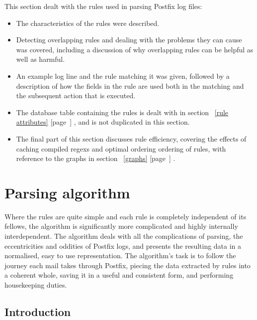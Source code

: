 \documentclass[a4paper,12pt,draft]{article}
\newcommand{\refwithpage}[1]{%
    \empty{}\ref{#1} [page~\pageref{#1}]%
}
\begin{document}
This section dealt with the rules used in parsing Postfix log files:

\begin{itemize}

    \item The characteristics of the rules were described.

    \item Detecting overlapping rules and dealing with the problems they
        can cause was covered, including a discussion of why overlapping
        rules can be helpful as well as harmful.

    \item An example log line and the rule matching it was given, followed
        by a description of how the fields in the rule are used both in the
        matching and the subsequent action that is executed.

    \item The database table containing the rules is dealt with in
        section~\refwithpage{rule attributes}, and is not duplicated in
        this section.

    \item The final part of this section discusses rule efficiency,
        covering the effects of caching compiled regexs and optimal
        ordering ordering of rules, with reference to the graphs in
        section~\refwithpage{graphs}.

\end{itemize}

\section{Parsing algorithm}

\label{parsing-algorithm}

Where the rules are quite simple and each rule is completely independent of
its fellows, the algorithm is significantly more complicated and highly
internally interdependent.  The algorithm deals with all the complications
of parsing, the eccentricities and oddities of Postfix logs, and presents
the resulting data in a normalised, easy to use representation.  The
algorithm's task is to follow the journey each mail takes through Postfix,
piecing the data extracted by rules into a coherent whole, saving it in a
useful and consistent form, and performing housekeeping duties.

\subsection{Introduction}
\end{document}
